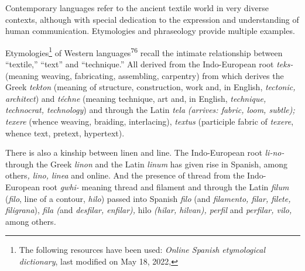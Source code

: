 \documentclass{tufte-handout}
\begin{document}
Contemporary languages refer to the ancient textile world in very
diverse contexts, although with special dedication to the expression and
understanding of human communication. Etymologies and phraseology
provide multiple examples.

Etymologies\footnote{The following resources have been used:
  \emph{Online Spanish etymological dictionary}, last modified on May
  18, 2022,} of Western languages\textsuperscript{76} recall the
intimate relationship between ``textile,'' ``text'' and ``technique.''
All derived from the Indo-European root \emph{teks- }(meaning weaving,
fabricating, assembling, carpentry) from which derives the Greek
\emph{tekton} (meaning of structure, construction, work and, in English,
\emph{tectonic, architect}) and \emph{téchne} (meaning technique, art
and, in English,\emph{ technique, technocrat, technology}) and through
the Latin \emph{tela} \emph{(arrives: fabric, loom, subtle); texere}
(whence weaving, braiding, interlacing), \emph{textus} (participle
fabric of \emph{texere}, whence text, pretext, hypertext).

There is also a kinship between linen and line. The Indo-European root
\emph{li-no-} through the Greek \emph{linon} and the Latin \emph{linum}
has given rise in Spanish, among others\emph{, lino, linea} and online.
And the presence of thread from the Indo-European root \emph{gwhi-}
meaning thread and filament and through the Latin \emph{filum}
(\emph{filo}, line of a contour, \emph{hilo}) passed into Spanish
\emph{filo} (and \emph{filamento, filar, filete, filigrana}), \emph{fila
(}and \emph{desfilar, enfilar),} hilo \emph{(hilar, hilvan), perfil} and
\emph{perfilar, vilo,} among others\emph{.}
\end{document}
